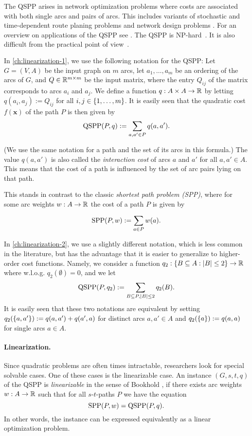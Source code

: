 The QSPP arises 
in network optimization  problems where costs are associated with both single arcs and pairs of arcs.
This includes 
variants of stochastic and time-dependent route planing  problems  
\cite{nie2009reliable,sen2001mean,sivakumar1994variance}
and network design problems 
\cite{murakami1997restoration,gamvros2006satellite}. 
For an overview on applications of the QSPP see \cite{huSo2020,rostami2018}.
The QSPP is NP-hard~\cite{rostami2018}.
It is also difficult from the practical point of view~\cite{huSo2020}.

In \cref{ch:linearization-1}, we use the following notation for the QSPP: Let $G = (V,A)$ be the input graph on $m$ arcs, let $a_1,\dots,a_m$ be an ordering of the arcs of $G$, and $Q \in \mathbb{R}^{m \times m}$ be the input matrix, where the entry $Q_{ij}$ of the matrix corresponds to arcs $a_i$ and $a_j$.
We define a function $q : A \times A \to \mathbb{R}$ by letting $q(a_i,a_j) := Q_{ij}$ for all $i,j \in \{ 1, \ldots, m \}$. It is easily seen that the quadratic cost $f(\pmb x)$ of the path $P$ is then given by
\[ \text{QSPP}(P, q) := \sum_{a,a' \in P} q(a,a').\] 

(We use the same notation for a path and the set of its arcs in this formula.) The value $q(a,a')$ is also called the \emph{interaction cost} of arcs $a$ and $a'$ for all $a,a' \in A$. This means that the cost of a path is influenced by the set of arc pairs lying on that path.

This stands in contrast to the classic \emph{shortest path problem (SPP)}, where for some arc weights $w : A \to \mathbb{R}$ the cost of a path $P$ is given by 

\[ \text{SPP}(P, w) := \sum_{a \in P} w(a).\]

In \cref{ch:linearization-2}, we use a slightly different notation, which is less common in the literature, but has the advantage that it is easier to generalize to higher-order cost functions. Namely, we consider a function $q_2 : \{ B \subseteq A : |B| \leq 2 \} \to \mathbb{R}$ where w.l.o.g. $q_2(\emptyset) = 0$, and we let
\[ \text{QSPP}(P, q_2) := \sum_{B \subseteq P, |B| \leq 2} q_2(B).\]
It is easily seen that these two notations are equivalent by setting $q_2(\{ a,a' \}) := q(a,a') + q(a',a)$ for distinct arcs $a,a' \in A$ and $q_2(\{ a \}) := q(a,a)$ for single arcs $a \in A$.

\paragraph*{Linearization.}
Since quadratic problems are often times intractable, researchers look for special solvable cases. One of these cases is the linearizable case. An instance $(G,s,t,q)$ of the QSPP is \emph{linearizable} in the sense of Bookhold \cite{bookhold1990contribution}, if there exists arc weights $w : A \to \mathbb{R}$ such that for all $s$-$t$-paths $P$ we have the equation 
\[\text{SPP}(P, w) = \text{QSPP}(P, q). \]
In other words, the instance can be expressed equivalently as a linear optimization problem.

